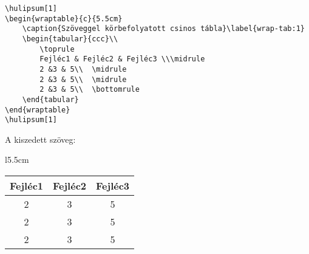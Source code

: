 \documentclass{article}
\begin{document}
\begin{verbatim}
\hulipsum[1]	
\begin{wraptable}{c}{5.5cm}
	\caption{Szöveggel körbefolyatott csinos tábla}\label{wrap-tab:1}
	\begin{tabular}{ccc}\\
		\toprule  
		Fejléc1 & Fejléc2 & Fejléc3 \\\midrule
		2 &3 & 5\\  \midrule
		2 &3 & 5\\  \midrule
		2 &3 & 5\\  \bottomrule
	\end{tabular}
\end{wraptable} 
\hulipsum[1]
\end{verbatim}

A kiszedett szöveg:

\hulipsum[1]
\begin{wraptable}{l}{5.5cm}
	\caption{Szöveggel körbefolyatott csinos tábla}\label{wrap-tab:1}
	\begin{tabular}{ccc}\\
		\toprule  
		Fejléc1 & Fejléc2 & Fejléc3 \\\midrule
		2 &3 & 5\\  \midrule
		2 &3 & 5\\  \midrule
		2 &3 & 5\\  \bottomrule
	\end{tabular}
\end{wraptable} 
\hulipsum[1] 
\end{document}
